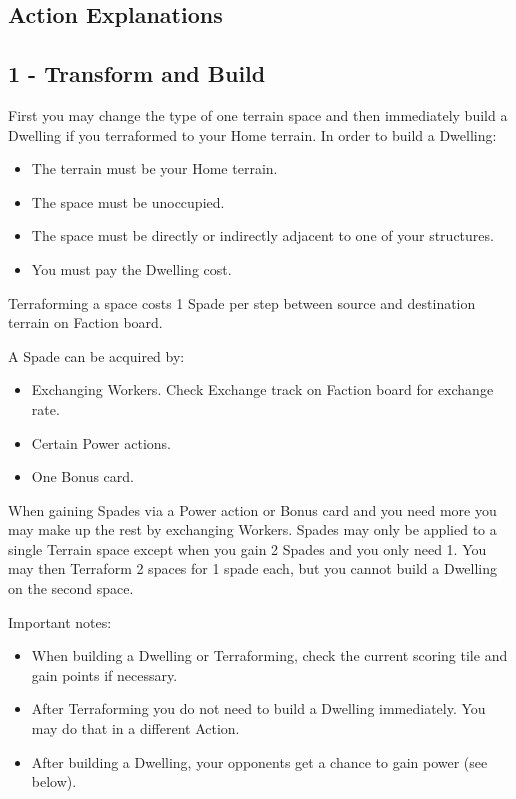 \documentclass[12pt]{article}
\newenvironment{itemizeCustom}
{\begin{itemize}
  \setlength{\itemsep}{1pt}
  \setlength{\parskip}{0pt}
  \setlength{\parsep}{0pt}}
{\end{itemize}}
\begin{document}
\begin{multicols*}{2}
\section*{Action Explanations}
\subsection*{1 - Transform and Build}
First you may change the type of one terrain space and then immediately build a Dwelling if you terraformed to your Home terrain. In order to build a Dwelling:
\begin{itemizeCustom}
    \item The terrain must be your Home terrain.
    \item The space must be unoccupied.
    \item The space must be directly or indirectly adjacent to one of your structures.
    \item You must pay the Dwelling cost.
\end{itemizeCustom}
Terraforming a space costs 1 Spade per step between source and destination terrain on Faction board.

\noindent
A Spade can be acquired by:
\begin{itemizeCustom}
    \item Exchanging Workers. Check Exchange track on Faction board for exchange rate.
    \item Certain Power actions.
    \item One Bonus card.
\end{itemizeCustom}

\noindent
When gaining Spades via a Power action or Bonus card and you need more you may make up the rest by exchanging Workers. Spades may only be applied to a single Terrain space except when you gain 2 Spades and you only need 1. You may then Terraform 2 spaces for 1 spade each, but you cannot build a Dwelling on the second space.

\noindent
Important notes:
\begin{itemizeCustom}
    \item When building a Dwelling or Terraforming, check the current scoring tile and gain points if necessary.
    \item After Terraforming you do not need to build a Dwelling immediately. You may do that in a different Action.
    \item After building a Dwelling, your opponents get a chance to gain power (see below).
\end{itemizeCustom}


\end{multicols*}
\end{document}
